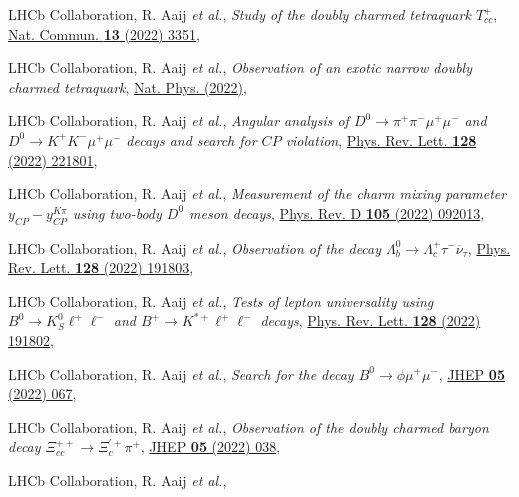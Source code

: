 \begin{cvcontent}
\begin{enumerate}[label={[\arabic*]}, leftmargin=1.5cm]
    \item LHCb Collaboration, R. Aaij \emph{et al.}, 
    \emph{Study of the doubly charmed tetraquark $T_{cc}^+$},
    \href{https://doi.org/10.1038/s41467-022-30206-w}{Nat. Commun. \textbf{13} (2022) 3351},
    \item LHCb Collaboration, R. Aaij \emph{et al.}, 
    \emph{Observation of an exotic narrow doubly charmed tetraquark},
    \href{https://doi.org/10.1038/s41567-022-01614-y}{Nat. Phys. (2022)},
    \sloppy
    \item LHCb Collaboration, R. Aaij \emph{et al.}, 
    \emph{Angular analysis of $D^0 \to \pi^+\pi^-\mu^+\mu^-$ and $D^0 \to K^+K^-\mu^+\mu^-$ decays and search for $CP$ violation},
    \href{https://link.aps.org/doi/10.1103/PhysRevLett.128.221801}{Phys. Rev. Lett. \textbf{128} (2022) 221801},
    \item LHCb Collaboration, R. Aaij \emph{et al.},
    \emph{Measurement of the charm mixing parameter $y_{CP} - y_{CP}^{K\pi}$ using two-body $D^0$ meson decays},
    \href{https://link.aps.org/doi/10.1103/PhysRevD.105.092013}{Phys. Rev. D \textbf{105} (2022) 092013},
    \item LHCb Collaboration, R. Aaij \emph{et al.}, 
    \emph{Observation of the decay $\Lambda_b^0 \rightarrow \Lambda_c^+\tau^-\overline{\nu}_{\tau}$},
    \href{https://link.aps.org/doi/10.1103/PhysRevLett.128.191803}{Phys. Rev. Lett. \textbf{128} (2022) 191803},
    \item LHCb Collaboration, R. Aaij \emph{et al.}, 
    \emph{Tests of lepton universality using $B^0\to K^0_S \ell^+ \ell^-$ and $B^+\to K^{*+}\ell^+\ell^-$ decays},
    \href{https://link.aps.org/doi/10.1103/PhysRevLett.128.191802}{Phys. Rev. Lett. \textbf{128} (2022) 191802},
    \item LHCb Collaboration, R. Aaij \emph{et al.},
    \emph{Search for the decay $B^0\to\phi\mu^+\mu^-$},
    \href{https://doi.org/10.1007/JHEP05(2022)067}{JHEP \textbf{05} (2022) 067},
    \item LHCb Collaboration, R. Aaij \emph{et al.},
    \emph{Observation of the doubly charmed baryon decay $\Xi_{cc}^{++}\to \Xi_{c}^{'+}\pi^{+}$},
    \href{https://doi.org/10.1007/JHEP05(2022)038}{JHEP \textbf{05} (2022) 038},
    \item LHCb Collaboration, R. Aaij \emph{et al.}, 

\end{enumerate}
\end{cvcontent}
